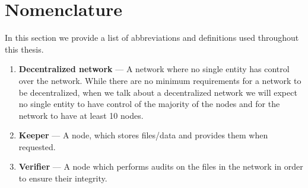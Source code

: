 \label{chapter:nomenclature}
\chapter*{Nomenclature}

In this section we provide a list of abbreviations and definitions used throughout this thesis.

\begin{enumerate}

    \item \textbf{Decentralized network} --- A network where no single entity has control over the network. While there are no minimum requirements for a network to be decentralized, when we talk about a decentralized network we will expect no single entity to have control of the majority of the nodes and for the network to have at least 10 nodes.
    \item \textbf{Keeper} --- A node, which stores files/data and provides them when requested.
    \item \textbf{Verifier} --- A node which performs audits on the files in the network in order to ensure their integrity.

\end{enumerate}
